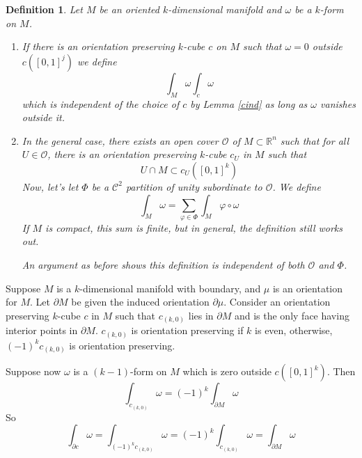 \documentclass{article}
\newtheorem{definition}{Definition}
\newcommand{\reals}[0]{\mathbb{R}}
\newcommand{\mc}[1]{\mathcal{#1}}
\begin{document}
\begin{definition}
  Let \(M\) be an oriented \(k\)-dimensional manifold and \(\omega\) be a \(k\)-form on \(M\).
  \begin{enumerate}

    \item If there is an orientation preserving \(k\)-cube \(c\) on \(M\) such that \(\omega = 0\) outside \(c([0, 1]^j)\) we define
    \begin{equation}
      \int_M\omega \int_c\omega
    \end{equation}
    which is independent of the choice of \(c\) by Lemma \ref{cind} as long as \(\omega\) vanishes outside it.

    \item In the general case, there exists an open cover \(\mc{O}\) of \(M \subset \reals^n\) such that for all \(U \in \mc{O}\), there is an orientation preserving \(k\)-cube \(c_U\) in \(M\) such that
    \begin{equation}
      U \cap M \subset c_U([0, 1]^k)
    \end{equation}
    Now, let's let \(\Phi\) be a \(\mc{C}^2\) partition of unity subordinate to \(\mc{O}\). We define
    \begin{equation}
      \int_M\omega = \sum_{\varphi \in \Phi}\int_{M}\varphi \circ \omega
    \end{equation}
    If \(M\) is compact, this sum is finite, but in general, the definition still works out.

    An argument as before shows this definition is independent of both \(\mc{O}\) and \(\Phi\).

  \end{enumerate}
\end{definition}

Suppose \(M\) is a \(k\)-dimensional manifold with boundary, and \(\mu\) is an orientation for \(M\). Let \(\partial M\) be given the induced orientation \(\partial\mu\). Consider an orientation preserving \(k\)-cube \(c\) in \(M\) such that \(c_{(k, 0)}\) lies in \(\partial M\) and is the only face having interior points in \(\partial M\).
\(c_{(k, 0)}\) is orientation preserving if \(k\) is even, otherwise, \((-1)^kc_{(k, 0)}\) is orientation preserving.

Suppose now \(\omega\) is a \((k - 1)\)-form on \(M\) which is zero outside \(c([0, 1]^k)\). Then
\begin{equation}
  \int_{c_{(k, 0)}}\omega = (-1)^k\int_{\partial M}\omega
\end{equation}
So
\begin{equation}
  \int_{\partial c}\omega = \int_{(-1)^kc_{(k, 0)}}\omega = (-1)^k\int_{c_{(k, 0)}}\omega = \int_{\partial M}\omega
\end{equation}
\end{document}

